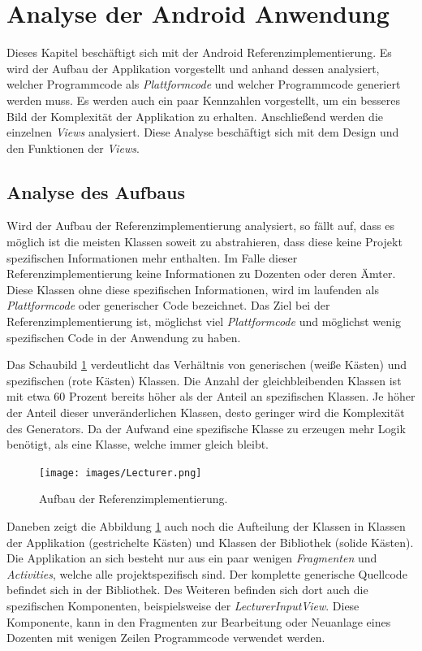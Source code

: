\section{Analyse der Android Anwendung}
Dieses Kapitel beschäftigt sich mit der Android Referenzimplementierung. Es wird der Aufbau der Applikation vorgestellt und anhand dessen analysiert, welcher Programmcode als \textit{Plattformcode} und welcher Programmcode generiert werden muss. Es werden auch ein paar Kennzahlen vorgestellt, um ein besseres Bild der Komplexität der Applikation zu erhalten. Anschließend werden die einzelnen \textit{Views} analysiert. Diese Analyse beschäftigt sich mit dem Design und den Funktionen der \textit{Views}.

\subsection{Analyse des Aufbaus}
Wird der Aufbau der Referenzimplementierung analysiert, so fällt auf, dass es möglich ist die meisten Klassen soweit zu abstrahieren, dass diese keine Projekt spezifischen Informationen mehr enthalten. Im Falle dieser Referenzimplementierung keine Informationen zu Dozenten oder deren Ämter. Diese Klassen ohne diese spezifischen Informationen, wird im laufenden als \textit{Plattformcode} oder generischer Code bezeichnet. Das Ziel bei der Referenzimplementierung ist, möglichst viel \textit{Plattformcode} und möglichst wenig spezifischen Code in der Anwendung zu haben. 

Das Schaubild \ref{fig:lecturer_structure} verdeutlicht das Verhältnis von generischen (weiße Kästen) und spezifischen (rote Kästen) Klassen. Die Anzahl der gleichbleibenden Klassen ist mit etwa 60 Prozent bereits höher als der Anteil an spezifischen Klassen. Je höher der Anteil dieser unveränderlichen Klassen, desto geringer wird die Komplexität des Generators. Da der Aufwand eine spezifische Klasse zu erzeugen mehr Logik benötigt, als eine Klasse, welche immer gleich bleibt.

\begin{figure}[H]
	\begin{center}
		\texttt{[image: images/Lecturer.png]}
		\caption{Aufbau der Referenzimplementierung.}
		\label{fig:lecturer_structure}
	\end{center}
\end{figure}

Daneben zeigt die Abbildung \ref{fig:lecturer_structure} auch noch die Aufteilung der Klassen in Klassen der Applikation (gestrichelte Kästen) und Klassen der Bibliothek (solide Kästen). Die Applikation an sich besteht nur aus ein paar wenigen \textit{Fragmenten} und \textit{Activities}, welche alle projektspezifisch sind. Der komplette generische Quellcode befindet sich in der Bibliothek. Des Weiteren befinden sich dort auch die spezifischen Komponenten, beispielsweise der \textit{LecturerInputView}. Diese Komponente, kann in den Fragmenten zur Bearbeitung oder Neuanlage eines Dozenten mit wenigen Zeilen Programmcode verwendet werden.

